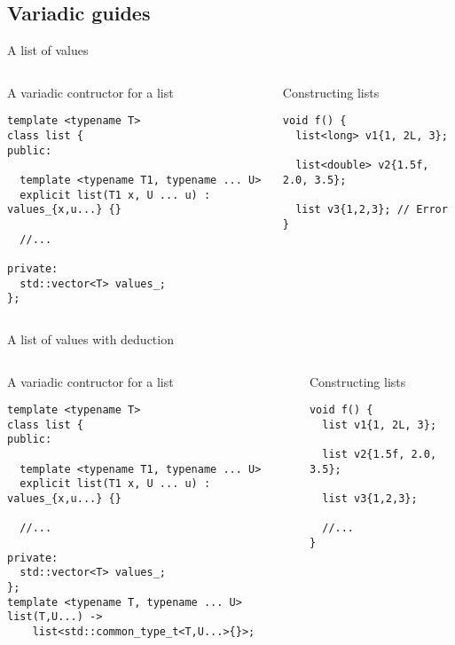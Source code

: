 \subsection{Variadic guides}

\begin{frame}[t,fragile]{A list of values}

\begin{columns}[T]

\begin{block}{A variadic contructor for a list}
\begin{lstlisting}
template <typename T>
class list {
public:

  template <typename T1, typename ... U>
  explicit list(T1 x, U ... u) : values_{x,u...} {}

  //...

private:
  std::vector<T> values_;
};
\end{lstlisting}
\end{block}

\pause
{}
\begin{block}{Constructing lists}
\begin{lstlisting}
void f() {
  list<long> v1{1, 2L, 3};

  list<double> v2{1.5f, 2.0, 3.5};

  list v3{1,2,3}; // Error
}
\end{lstlisting}
\end{block}

\end{columns}
\end{frame}

\begin{frame}[t,fragile]{A list of values with deduction}

\begin{columns}[T]

\begin{block}{A variadic contructor for a list}
\begin{lstlisting}[escapechar=@]
template <typename T>
class list {
public:

  template <typename T1, typename ... U>
  explicit list(T1 x, U ... u) : values_{x,u...} {}

  //...

private:
  std::vector<T> values_;
};
template <typename T, typename ... U>
list(T,U...) -> 
    list<std::common_type_t<T,U...>{}>;
\end{lstlisting}
\end{block}

\pause
{}
\begin{block}{Constructing lists}
\begin{lstlisting}
void f() {
  list v1{1, 2L, 3};

  list v2{1.5f, 2.0, 3.5};

  list v3{1,2,3};

  //...
}
\end{lstlisting}
\end{block}

\end{columns}
\end{frame}
